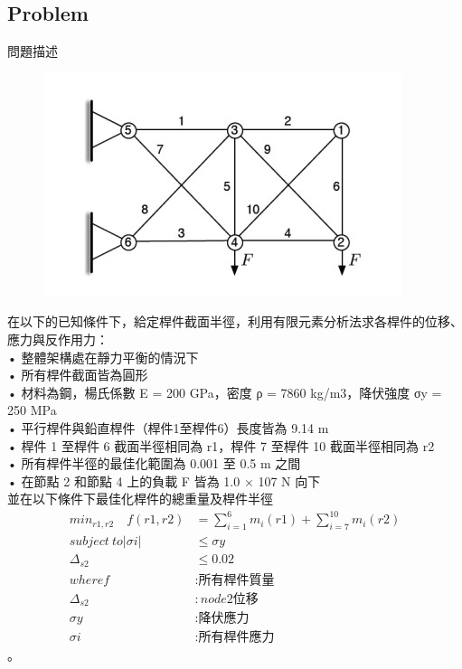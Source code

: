 \documentclass[12pt]{article}
\begin{document}
\begin{CJK}{UTF8}{bkai}

\cfoot{\thepage}

\tableofcontents\thispagestyle{fancy}


\section{Problem }

問題描述\\

\begin{figure}[h]
\includegraphics[scale=1.0]{./graph/10bar.jpg}
\end{figure}

在以下的已知條件下，給定桿件截面半徑，利用有限元素分析法求各桿件的位移、應力與反作用力：\\
 • 整體架構處在靜力平衡的情況下\\
 • 所有桿件截面皆為圓形\\
 • 材料為鋼，楊氏係數 E = 200 GPa，密度 ρ = 7860 kg/m3，降伏強度 σy = 250 MPa\\
 • 平行桿件與鉛直桿件（桿件1至桿件6）長度皆為 9.14 m\\
 • 桿件 1 至桿件 6 截面半徑相同為 r1，桿件 7 至桿件 10 截面半徑相同為 r2\\
 • 所有桿件半徑的最佳化範圍為 0.001 至 0.5 m 之間\\
 • 在節點 2 和節點 4 上的負載 F 皆為 1.0 × 107 N 向下\\
 
並在以下條件下最佳化桿件的總重量及桿件半徑\\

\begin{align}
    min_{r1,r2} \quad  f(r1,r2)&= \sum_{i=1}^{6} m_i(r1)+ \sum_{i=7}^{10} m_i(r2)\\
    subject \ to \left| \sigma i \right| &\leq \sigma y\\
    \Delta _{s2} &\leq 0.02\\
     where f&:\mbox{所有桿件質量}\\
 	\Delta _{s2}&:node 2\mbox{位移}\\
 	\sigma y&:\mbox{降伏應力}\\
	\sigma i&:\mbox{所有桿件應力}\
\end{align}
 。





\end{CJK}
\end{document}
